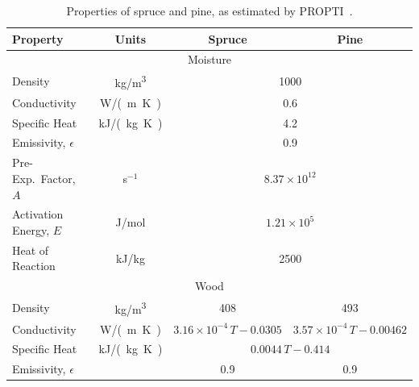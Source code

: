 \begin{table}[h!]
\caption[Properties of spruce and pine]{Properties of spruce and pine, as estimated by PROPTI~\cite{Rinta-Paavola:2023}.}
\begin{center}
\begin{tabular}{|l|c|c|c|}
\hline
Property                     & Units         & Spruce                & Pine                                        \\ \hline \hline
\multicolumn{4}{|c|}{Moisture}                                                                                     \\ \hline
Density                      & \unit{kg/m^3}      & \multicolumn{2}{|c|}{1000}                                          \\ \hline
Conductivity                 & \unit{W/(m.K)}& \multicolumn{2}{|c|}{0.6}                                           \\ \hline
Specific Heat                & \unit{kJ/(kg.K)}       & \multicolumn{2}{|c|}{4.2}                                           \\ \hline
Emissivity, $\epsilon$       &               & \multicolumn{2}{|c|}{0.9}                                           \\ \hline
Pre-Exp.~Factor, $A$         & s$^{-1}$      & \multicolumn{2}{|c|}{$8.37 \times 10^{12}$}                         \\ \hline
Activation Energy, $E$       & J/mol         & \multicolumn{2}{|c|}{$1.21 \times 10^{5}$}                          \\ \hline
Heat of Reaction             & kJ/kg         & \multicolumn{2}{|c|}{2500}                                          \\ \hline
\multicolumn{4}{|c|}{Wood}                                                                                         \\ \hline
Density                      & \unit{kg/m^3}      & 408                             & 493                               \\ \hline
Conductivity                 & \unit{W/(m.K)}& $3.16\times 10^{-4}\, T-0.0305$ & $3.57\times 10^{-4}\, T-0.00462$  \\ \hline
Specific Heat                & \unit{kJ/(kg.K)}       & \multicolumn{2}{|c|}{$0.0044 \,T - 0.414$}                          \\ \hline
Emissivity, $\epsilon$       &               & 0.9                             & 0.9                               \\ \hline

\end{tabular}
\end{center}
\end{table}
